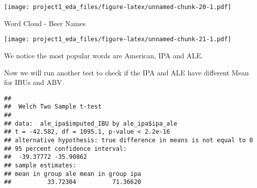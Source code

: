 \documentclass[]{article}
\newenvironment{Shaded}{\begin{snugshade}}{\end{snugshade}}
\newcommand{\CommentTok}[1]{\textcolor[rgb]{0.56,0.35,0.01}{\textit{#1}}}
\newcommand{\DataTypeTok}[1]{\textcolor[rgb]{0.13,0.29,0.53}{#1}}
\newcommand{\DecValTok}[1]{\textcolor[rgb]{0.00,0.00,0.81}{#1}}
\newcommand{\FloatTok}[1]{\textcolor[rgb]{0.00,0.00,0.81}{#1}}
\newcommand{\KeywordTok}[1]{\textcolor[rgb]{0.13,0.29,0.53}{\textbf{#1}}}
\newcommand{\NormalTok}[1]{#1}
\newcommand{\OperatorTok}[1]{\textcolor[rgb]{0.81,0.36,0.00}{\textbf{#1}}}
\newcommand{\OtherTok}[1]{\textcolor[rgb]{0.56,0.35,0.01}{#1}}
\newcommand{\StringTok}[1]{\textcolor[rgb]{0.31,0.60,0.02}{#1}}
\begin{document}
\texttt{[image: project1\_eda\_files/figure-latex/unnamed-chunk-20-1.pdf]}

Word Cloud - Beer Names

\begin{Shaded}
\end{Shaded}

\texttt{[image: project1\_eda\_files/figure-latex/unnamed-chunk-21-1.pdf]}

We notice the most popular words are American, IPA and ALE.

Now we will run another test to check if the IPA and ALE have different
Mean for IBUs and ABV.

\begin{Shaded}
\end{Shaded}

\begin{verbatim}
## 
##  Welch Two Sample t-test
## 
## data:  ale_ipa$imputed_IBU by ale_ipa$ipa_ale
## t = -42.582, df = 1095.1, p-value < 2.2e-16
## alternative hypothesis: true difference in means is not equal to 0
## 95 percent confidence interval:
##  -39.37772 -35.90862
## sample estimates:
## mean in group ale mean in group ipa 
##          33.72304          71.36620
\end{verbatim}

\begin{Shaded}
\end{Shaded}
\end{document}
